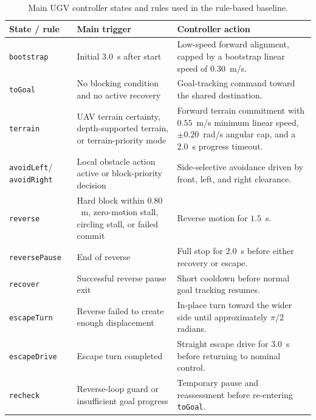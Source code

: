 \begin{table}[tbp]
    \caption{Main UGV controller states and rules used in the rule-based baseline.}
    \label{tab:ugv_rule_summary}
    \centering
    \small
    \setlength{\tabcolsep}{4pt}
    \renewcommand{\arraystretch}{1.15}
    \begin{tabularx}{\textwidth}{@{}>{\raggedright\arraybackslash}p{}>{\raggedright\arraybackslash}p{}X@{}}
        \toprule
        \textbf{State / rule} & \textbf{Main trigger} & \textbf{Controller action} \\
        \midrule
        \texttt{bootstrap} & Initial $3.0$~s after start & Low-speed forward alignment, capped by a bootstrap linear speed of $0.30$~m/s. \\
        \texttt{toGoal} & No blocking condition and no active recovery & Goal-tracking command toward the shared destination. \\
        \texttt{terrain} & UAV terrain certainty, depth-supported terrain, or terrain-priority mode & Forward terrain commitment with $0.55$~m/s minimum linear speed, $\pm0.20$~rad/s angular cap, and a $2.0$~s progress timeout. \\
        \texttt{avoidLeft}/ \texttt{avoidRight} & Local obstacle action active or block-priority decision & Side-selective avoidance driven by front, left, and right clearance. \\
        \texttt{reverse} & Hard block within $0.80$~m, zero-motion stall, circling stall, or failed commit & Reverse motion for $1.5$~s. \\
        \texttt{reversePause} & End of reverse & Full stop for $2.0$~s before either recovery or escape. \\
        \texttt{recover} & Successful reverse pause exit & Short cooldown before normal goal tracking resumes. \\
        \texttt{escapeTurn} & Reverse failed to create enough displacement & In-place turn toward the wider side until approximately $\pi/2$ radians. \\
        \texttt{escapeDrive} & Escape turn completed & Straight escape drive for $3.0$~s before returning to nominal control. \\
        \texttt{recheck} & Reverse-loop guard or insufficient goal progress & Temporary pause and reassessment before re-entering \texttt{toGoal}. \\
        \bottomrule
    \end{tabularx}
\end{table}

